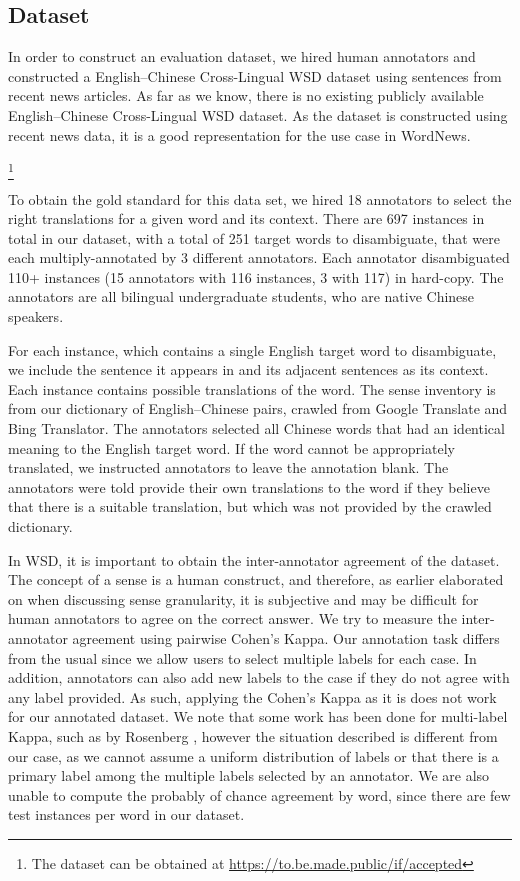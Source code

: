 \subsection{Dataset}
In order to construct an evaluation dataset, we hired human annotators and constructed a English--Chinese Cross-Lingual WSD dataset using sentences from recent news articles. As far as we know, there is no existing publicly available English--Chinese Cross-Lingual WSD dataset. As the dataset is constructed using recent news data, it is a good representation for the use case in WordNews. {\footnote{The dataset can be obtained at %
{\url{https://to.be.made.public/if/accepted}}}

To obtain the gold standard for this data set, we hired 18 annotators to select the right translations for a given word and its context. There are 697 instances in total in our dataset, with a total of 251 target words to disambiguate, that were each multiply-annotated by 3 different annotators. Each annotator disambiguated 110+ instances (15 annotators with 116 instances, 3 with 117) in hard-copy. The annotators are all bilingual undergraduate students, who are native Chinese speakers. 

For each instance, which contains a single English target word to disambiguate, we include the sentence it appears in and its adjacent sentences as its context. Each instance contains possible translations of the word. The sense inventory is from our dictionary of English--Chinese pairs, crawled from Google Translate and Bing Translator. The annotators selected all Chinese words that had an identical meaning to the English target word. If the word cannot be appropriately translated, we instructed annotators to leave the annotation blank. The annotators were told provide their own translations to the word if they believe that there is a suitable translation, but which was not provided by the crawled dictionary. 

In WSD, it is important to obtain the inter-annotator agreement of the dataset. The concept of a sense is a human construct, and therefore, as earlier elaborated on when discussing sense granularity, it is subjective and may be difficult for human annotators to agree on the correct answer. We try to measure the inter-annotator agreement using pairwise Cohen's Kappa. Our annotation task differs from the usual since we allow users to select multiple labels for each case. In addition, annotators can also add new labels to the case if they do not agree with any label provided. As such, applying the Cohen's Kappa as it is does not work for our annotated dataset. We note that some work has been done for multi-label Kappa, such as by Rosenberg , however the situation described  is different from our case, as we cannot assume a uniform distribution of labels or that there is a primary label among the multiple labels selected by an annotator. We are also unable to compute the probably of chance agreement by word, since there are few test instances per word in our dataset.

}
